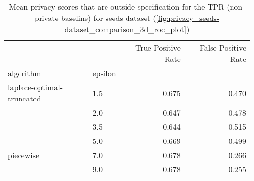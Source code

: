 \begin{table}[H]
    \begin{tabularx}{0.8\textwidth}{llrr}
        \toprule
                                  &         & True Positive Rate & False Positive Rate \\
        algorithm                 & epsilon &                    &                     \\
        \midrule
        laplace-optimal-truncated & 1.5     & 0.675              & 0.470               \\
                                  & 2.0     & 0.647              & 0.478               \\
                                  & 3.5     & 0.644              & 0.515               \\
                                  & 5.0     & 0.669              & 0.499               \\
        piecewise                 & 7.0     & 0.678              & 0.266               \\
                                  & 9.0     & 0.678              & 0.255               \\
        \bottomrule
    \end{tabularx}
    \caption{Mean privacy scores that are outside specification for the TPR (non-private baseline) for seeds dataset (\ref{fig:privacy_seeds-dataset_comparison_3d_roc_plot})}

\end{table}